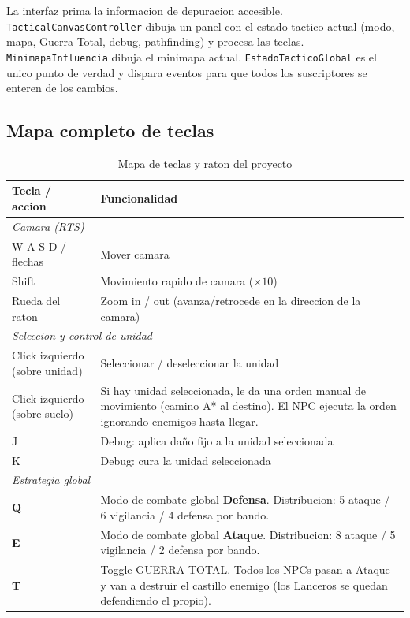 \documentclass[12pt,a4paper]{article}
\begin{document}
La interfaz prima la informacion de depuracion accesible.
\texttt{TacticalCanvasController} dibuja un panel con el estado tactico
actual (modo, mapa, Guerra Total, debug, pathfinding) y procesa las
teclas. \texttt{MinimapaInfluencia} dibuja el minimapa actual.
\texttt{EstadoTacticoGlobal} es el unico punto de verdad y dispara
eventos para que todos los suscriptores se enteren de los cambios.

\subsection{Mapa completo de teclas}

\begin{table}[H]
\centering
\caption{Mapa de teclas y raton del proyecto}
\label{tab:teclas}
\renewcommand{\arraystretch}{1.15}
\begin{tabularx}{\textwidth}{l X}
\toprule
\textbf{Tecla / accion} & \textbf{Funcionalidad} \\
\midrule
\multicolumn{2}{l}{\textit{Camara (RTS)}} \\
W A S D / flechas & Mover camara \\
Shift             & Movimiento rapido de camara ($\times 10$) \\
Rueda del raton   & Zoom in / out (avanza/retrocede en la direccion de la camara) \\
\midrule
\multicolumn{2}{l}{\textit{Seleccion y control de unidad}} \\
Click izquierdo (sobre unidad) & Seleccionar / deseleccionar la unidad \\
Click izquierdo (sobre suelo)  & Si hay unidad seleccionada, le da una orden manual de movimiento (camino A* al destino). El NPC ejecuta la orden ignorando enemigos hasta llegar. \\
J                 & Debug: aplica daño fijo a la unidad seleccionada \\
K                 & Debug: cura la unidad seleccionada \\
\midrule
\multicolumn{2}{l}{\textit{Estrategia global}} \\
\textbf{Q}        & Modo de combate global \textbf{Defensa}. Distribucion: 5 ataque / 6 vigilancia / 4 defensa por bando. \\
\textbf{E}        & Modo de combate global \textbf{Ataque}. Distribucion: 8 ataque / 5 vigilancia / 2 defensa por bando. \\
\textbf{T}        & Toggle GUERRA TOTAL. Todos los NPCs pasan a Ataque y van a destruir el castillo enemigo (los Lanceros se quedan defendiendo el propio). \\

\end{tabularx}
\end{table}
\end{document}
